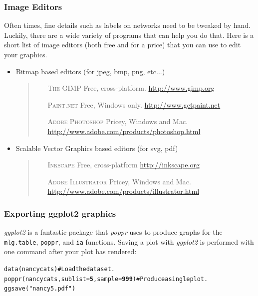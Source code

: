\documentclass[letterpaper]{article}\usepackage[]{graphicx}\usepackage[]{color}
\makeatletter
\newcommand{\hlnum}[1]{\textcolor[rgb]{0.502,0,0.502}{\textbf{#1}}}%
\newcommand{\hlstr}[1]{\textcolor[rgb]{0.651,0.522,0}{#1}}%
\newcommand{\hlcom}[1]{\textcolor[rgb]{1,0.502,0}{#1}}%
\newcommand{\hlstd}[1]{\textcolor[rgb]{0,0,0}{#1}}%
\newcommand{\hlkwc}[1]{\textcolor[rgb]{0,0.502,0.753}{#1}}%
\newcommand{\hlkwd}[1]{\textcolor[rgb]{0,0.267,0.4}{#1}}%
\newenvironment{kframe}{%
 \def\at@end@of@kframe{}%
 \ifinner\ifhmode%
  \def\at@end@of@kframe{\end{minipage}}%
  \begin{minipage}{\columnwidth}%
 \fi\fi%
 \def\FrameCommand##1{\hskip\@totalleftmargin \hskip-\fboxsep
 \colorbox{shadecolor}{##1}\hskip-\fboxsep
     \hskip-\linewidth \hskip-\@totalleftmargin \hskip\columnwidth}%
 \MakeFramed {\advance\hsize-\width
   \@totalleftmargin\z@ \linewidth\hsize
   \@setminipage}}%
 {\par\unskip\endMakeFramed%
 \at@end@of@kframe}
\newenvironment{knitrout}{}{} %
\newcommand{\tab}{\hspace*{1em}}
\makeatother
\begin{document}
\subsubsection{Image Editors}\label{appendix:graphics:editors}
\tab\tab Often times, fine details such as labels on networks need to be tweaked by hand. Luckily, there are a wide variety of programs that can help you do that. Here is a short list of image editors (both free and for a price) that you can use to edit your graphics.
\begin{itemize}
  \item Bitmap based editors (for jpeg, bmp, png, etc...)
  \begin{quote}
  \begin{itemize}
    \item[ \scshape The GIMP ] Free, cross-platform. \url{http://www.gimp.org}
    \item[ \scshape Paint.net ] Free, Windows only. \url{http://www.getpaint.net}
    \item[ \scshape Adobe Photoshop ] Pricey, Windows and Mac. \url{http://www.adobe.com/products/photoshop.html}
  \end{itemize}
  \end{quote}
  \item Scalable Vector Graphics based editors (for svg, pdf)
  \begin{quote}
  \begin{itemize}
    \item[ \scshape Inkscape ] Free, cross-platform \url{http://inkscape.org}
    \item[ \scshape Adobe Illustrator ] Pricey, Windows and Mac. \url{http://www.adobe.com/products/illustrator.html}
  \end{itemize}
  \end{quote}
\end{itemize}

\subsubsection{Exporting ggplot2 graphics}\label{appendix:graphics:ggplot2}
\tab\tab \textit{ggplot2} is a fantastic package that \textit{poppr} uses to produce graphs for the \texttt{mlg.table}, \texttt{poppr}, and \texttt{ia} functions. Saving a plot with \textit{ggplot2} is performed with one command after your plot has rendered:
\begin{knitrout}\footnotesize
{}\color{fgcolor}\begin{kframe}
\begin{alltt}
\hlkwd{data}\hlstd{(nancycats)}  \hlcom{# Load the data set.}
\hlkwd{poppr}\hlstd{(nancycats,} \hlkwc{sublist} \hlstd{=} \hlnum{5}\hlstd{,} \hlkwc{sample} \hlstd{=} \hlnum{999}\hlstd{)}  \hlcom{# Produce a single plot.}
\hlkwd{ggsave}\hlstd{(}\hlstr{"nancy5.pdf"}\hlstd{)}
\end{alltt}
\end{kframe}
\end{knitrout}
\end{document}
